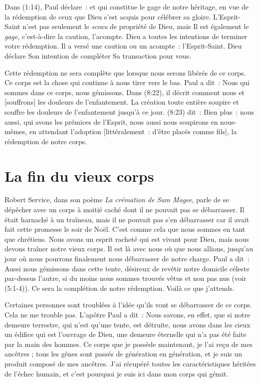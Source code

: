 Dans (1:14), Paul déclare~:
 \og [\dots{}] et qui constitue le gage de notre héritage,
 en vue de la rédemption de ceux que Dieu s'est acquis
 pour célébrer sa gloire. \fg{}
 L'Esprit-Saint n'est pas seulement le \emph{sceau} de propriété de Dieu,
 mais Il est également le \emph{gage}, c'est-à-dire la caution, l'acompte.
 Dieu a toutes les intentions de terminer votre rédemption.
 Il a versé une caution ou un acompte~: l'Esprit-Saint.
 Dieu déclare Son intention de compléter Sa transaction pour vous.

Cette rédemption ne sera complète que lorsque nous serons libérés
 de ce corps.
 Ce corps est la chose qui continue à nous tirer vers le bas.
 Paul a dit~:
 \og Nous qui sommes dans ce corps, nous gémissons. \fg{}
 Dans (8:22), il décrit comment nous
 \og [soupirons] et [souffrons] les douleurs de l'enfantement. \fg{}
 La création toute entière soupire et souffre
 les douleurs de l'enfantement jusqu'à ce jour.
 (8:23) dit~:
 \og Bien plus~: nous aussi, qui avons les prémices de l'Esprit,
 nous aussi nous soupirons en nous-mêmes, en attendant l'adoption
 [littéralement~: d'être placés comme fils],
 la rédemption de notre corps. \fg{}


\section{La fin du vieux corps}

Robert Service, dans son poème \emph{La crémation de Sam Magee},
 parle de se dépêcher \og avec un corps à moitié caché
 dont il ne pouvait pas se débarrasser. \fg{}
 Il était harnaché à un traîneau, mais il ne pouvait pas s'en débarrasser
 car il avait fait cette promesse le soir de Noël.
 C'est comme cela que nous sommes en tant que chrétiens.
 Nous avons un esprit racheté qui est vivant pour Dieu,
 mais nous devons traîner notre vieux corps.
 Il est là avec nous où que nous allions, jusqu'au jour où nous pourrons
 finalement nous débarrasser de notre charge. Paul a dit~:
 \og Aussi nous gémissons dans cette tente, désireux de revêtir
 notre domicile céleste par-dessus l'autre, si du moins nous sommes
 trouvés vêtus et non pas nus \fg{} (voir (5:1-4)).
 Ce sera la complétion de notre rédemption. Voilà ce que j'attends.

Certaines personnes sont troublées
 à l'idée qu'ils vont se débarrasser de ce corps. Cela ne me trouble pas.
 L'apôtre Paul a dit~:
 \og  Nous savons, en effet, que si notre demeure terrestre,
 qui n'est qu'une tente, est détruite, nous avons dans les cieux
 un édifice qui est l'ouvrage de Dieu, une demeure éternelle
 qui n'a pas été faite par la main des hommes. \fg{}
 Ce corps que je possède maintenant, je l'ai reçu de mes ancêtres ;
 tous les gênes sont passés de génération en génération,
 et je suis un produit composé de mes ancêtres.
 J'ai récupéré toutes les caractéristiques héritées de l'échec humain,
 et c'est pourquoi je suis ici dans mon corps qui gémit.



